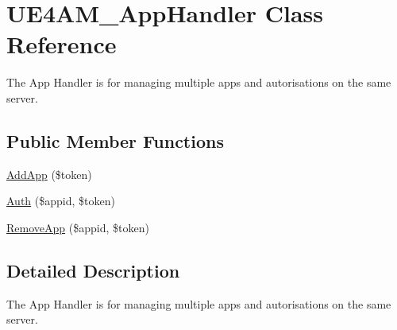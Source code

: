 \hypertarget{class_u_e4_a_m___app_handler}{\section{U\-E4\-A\-M\-\_\-\-App\-Handler Class Reference}
\label{class_u_e4_a_m___app_handler}
}


The App Handler is for managing multiple apps and autorisations on the same server.  


\subsection*{Public Member Functions}
\begin{DoxyCompactItemize}
\item 
\hyperlink{class_u_e4_a_m___app_handler_a919f9fd314bea09db6a45a5f2bf4b28f}{Add\-App} (\$token)
\item 
\hyperlink{class_u_e4_a_m___app_handler_a2de878e2040a5f01b8537a159cde6b91}{Auth} (\$appid, \$token)
\item 
\hyperlink{class_u_e4_a_m___app_handler_a94694c6eb18f42b9ae57fb363541c3f4}{Remove\-App} (\$appid, \$token)
\end{DoxyCompactItemize}


\subsection{Detailed Description}
The App Handler is for managing multiple apps and autorisations on the same server. 

